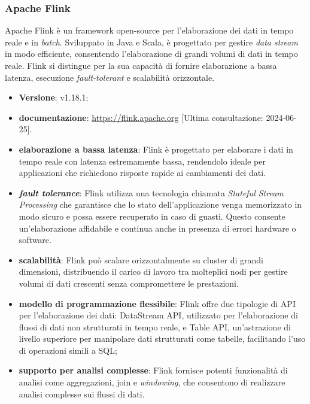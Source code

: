 \subsubsection{Apache Flink} \label{sec:flink}
Apache Flink è un framework open-source per l'elaborazione dei dati in tempo reale e in \textit{batch}.
Sviluppato in Java e Scala, è progettato per gestire \textit{data stream} in modo efficiente, consentendo l'elaborazione di grandi volumi di dati in tempo reale.
Flink si distingue per la sua capacità di fornire elaborazione a bassa latenza, esecuzione \textit{fault-tolerant} e scalabilità orizzontale.

\begin{itemize}
	\item \textbf{Versione}: v1.18.1;
	\item \textbf{documentazione}: \url{https://flink.apache.org} [Ultima consultazione: 2024-06-25].
\end{itemize}

\begin{itemize}
	\item \textbf{elaborazione a bassa latenza}: Flink è progettato per elaborare i dati in tempo reale con latenza estremamente bassa, rendendolo ideale per applicazioni che richiedono risposte rapide ai cambiamenti dei dati.
	\item \textbf{\textit{fault tolerance}}: Flink utilizza una tecnologia chiamata \textit{Stateful Stream Processing} che garantisce che lo stato dell'applicazione venga memorizzato in modo sicuro e possa essere recuperato in caso di guasti. Questo consente un'elaborazione affidabile e continua anche in presenza di errori hardware o software.
	\item \textbf{scalabilità}: Flink può scalare orizzontalmente su cluster di grandi dimensioni, distribuendo il carico di lavoro tra molteplici nodi per gestire volumi di dati crescenti senza compromettere le prestazioni.
	\item \textbf{modello di programmazione flessibile}: Flink offre due tipologie di API per l'elaborazione dei dati: DataStream API, utilizzato per l'elaborazione di flussi di dati non strutturati in tempo reale, e Table API, un'astrazione di livello superiore per manipolare dati strutturati come tabelle, facilitando l'uso di operazioni simili a SQL;
	\item \textbf{supporto per analisi complesse}: Flink fornisce potenti funzionalità di analisi come aggregazioni, join e \textit{windowing}, che consentono di realizzare analisi complesse sui flussi di dati.
\end{itemize}

